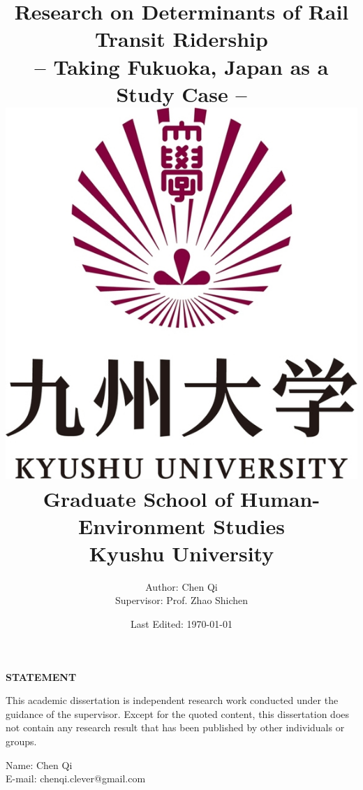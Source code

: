 \documentclass[12pt, twoside, a4paper]{book} %
\renewcommand{\baselinestretch}{1.5} %
\begin{document}
\title{
	{\textbf{\Huge Research on Determinants of Rail Transit Ridership}
				\\ -- Taking Fukuoka, Japan as a Study Case --}\\
	{\vspace{3cm}}
	{\includegraphics[width=0.2\linewidth]{university.jpg}}\\
	{\vspace{2cm}}
	{\large Graduate School of Human-Environment Studies}\\
	{\large Kyushu University}
}
\author{
	{\large Author: Chen Qi}\\
	{\large Supervisor: Prof. Zhao Shichen}
	{\vspace{1cm}}
}
\date{\normalsize Last Edited: \today}
\maketitle

\centerline{\textbf{\Large STATEMENT}}
%
This academic dissertation is independent research work conducted under the guidance of the supervisor. Except for the quoted content, this dissertation does not contain any research result that has been published by other individuals or groups.\\
\newline
\newline
%
%

\begin{flushright}
	Name: Chen Qi \\
	E-mail: chenqi.clever@gmail.com \\
\end{flushright}

\renewcommand{\baselinestretch}{1.0} %
\fontsize{14pt}{14pt} %
\selectfont

\tableofcontents %
\listoffigures %
\listoftables %
\end{document}
